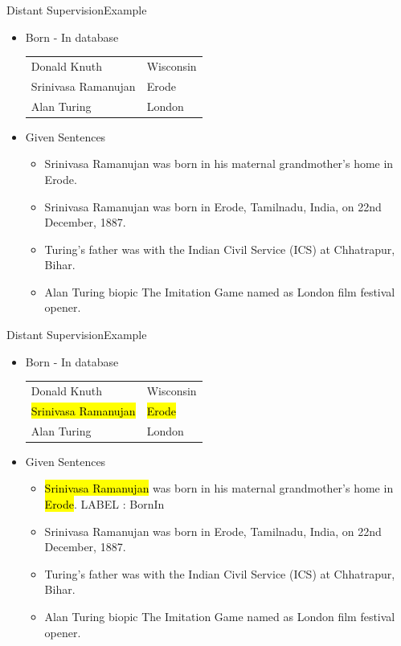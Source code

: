 \documentclass{beamer}
\makeatletter
\newcommand\SoulColor{%
  \let\set@color\beamerorig@set@color
  \let\reset@color\beamerorig@reset@color}
\makeatother
\begin{document}
\begin{frame}{Distant Supervision}{Example}
\begin{itemize}
 
\item Born - In database
 \begin{center}
\begin{tabular}{|l|l|}
\hline
Donald Knuth & Wisconsin \\
Srinivasa Ramanujan & Erode \\
Alan Turing & London \\
\hline
\end{tabular}
\end{center}
\item Given Sentences
\begin{itemize}
\item Srinivasa Ramanujan was born in his maternal grandmother’s home in Erode.
\item Srinivasa Ramanujan was born in Erode, Tamilnadu, India, on 22nd December, 1887.
\item Turing's father was with the Indian Civil Service (ICS) at Chhatrapur, Bihar.
\item Alan Turing biopic The Imitation Game named as London film festival opener.
\end{itemize}
\end{itemize}
 
\end{frame}
\begin{frame}{Distant Supervision}{Example}
\begin{itemize}
 
\item Born - In database
 \begin{center}
\begin{tabular}{|l|l|}
\hline
Donald Knuth & Wisconsin \\
\SoulColor\hl{Srinivasa Ramanujan} & \SoulColor\hl{Erode} \\
Alan Turing & London \\
\hline
\end{tabular}
\end{center}
\item Given Sentences
\begin{itemize}
\item \alert<+> {\SoulColor\hl{Srinivasa Ramanujan} was born in his maternal grandmother’s home in \SoulColor\hl{Erode}.} \alert{LABEL : BornIn} \checkmark
\item Srinivasa Ramanujan was born in Erode, Tamilnadu, India, on 22nd December, 1887.
\item Turing's father was with the Indian Civil Service (ICS) at Chhatrapur, Bihar.
\item Alan Turing biopic The Imitation Game named as London film festival opener.
\end{itemize}
\end{itemize}
 
\end{frame}
\end{document}
